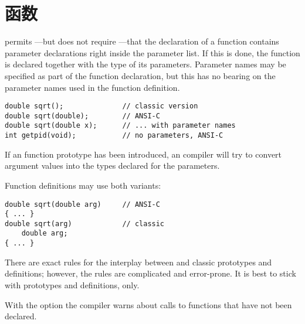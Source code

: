 \section{函数}
 permits ---but does not require ---that the declaration of a
function contains parameter declarations right inside the parameter list.
If this is done, the function is declared together with the type of its
parameters. Parameter names may be specified as part of the function
declaration, but this has no bearing on the parameter names used in the
function definition.
\begin{lstlisting}
double sqrt();				// classic version
double sqrt(double);		// ANSI-C
double sqrt(double x);		// ... with parameter names
int getpid(void);			// no parameters, ANSI-C
\end{lstlisting}
If an  function prototype has been introduced, an 
compiler will try to convert argument values into the types declared for the
parameters.

Function definitions may use both variants:
\begin{lstlisting}
double sqrt(double arg)		// ANSI-C
{ ... }
double sqrt(arg)			// classic
	double arg;
{ ... }
\end{lstlisting}
There are exact rules for the interplay between  and classic
prototypes and definitions; however, the rules are complicated and
error-prone. It is best to stick with  prototypes and
definitions, only.

With the option  the  compiler warns about calls to
functions that have not been declared.

